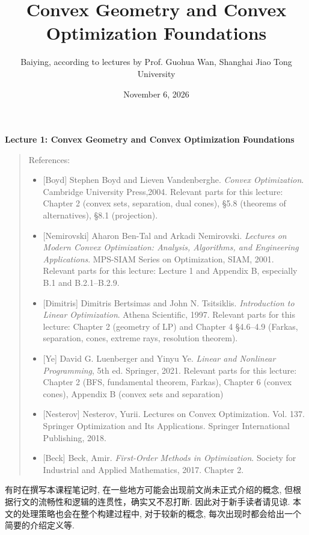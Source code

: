 \documentclass[11pt,UTF8,scheme=plain,fontset=fandol,linespread=1.3]{ctexart}
\title{\textbf{Convex Geometry and Convex Optimization Foundations}}
\author{Baiying, according to lectures by Prof. Guohua Wan, Shanghai Jiao Tong University}
\date{November 6, 2026}
\numberwithin{figure}{section}
\begin{document}
\maketitle
\textbf{Lecture 1: Convex Geometry and Convex Optimization Foundations}

\begin{quote}
References:

\begin{itemize}
\item {}[Boyd] Stephen Boyd and Lieven Vandenberghe. \emph{Convex Optimization}. Cambridge University Press,2004. Relevant parts for this lecture: Chapter 2 (convex sets, separation, dual cones), §5.8 (theorems of alternatives), §8.1 (projection).


\item {}[Nemirovski] Aharon Ben-Tal and Arkadi Nemirovski. \emph{Lectures on Modern Convex Optimization: Analysis, Algorithms, and Engineering Applications}. MPS-SIAM Series on Optimization, SIAM, 2001. Relevant parts for this lecture: Lecture 1 and Appendix B, especially B.1 and B.2.1–B.2.9.


\item {}[Dimitris] Dimitris Bertsimas and John N. Tsitsiklis. \emph{Introduction to Linear Optimization}. Athena Scientific, 1997. Relevant parts for this lecture: Chapter 2 (geometry of LP) and Chapter 4 §4.6–4.9 (Farkas, separation, cones, extreme rays, resolution theorem).


\item {}[Ye] David G. Luenberger and Yinyu Ye. \emph{Linear and Nonlinear Programming}, 5th ed. Springer, 2021. Relevant parts for this lecture: Chapter 2 (BFS, fundamental theorem, Farkas), Chapter 6 (convex cones), Appendix B (convex sets and separation)


\item {}[Nesterov] Nesterov, Yurii. Lectures on Convex Optimization. Vol. 137. Springer Optimization and Its Applications. Springer International Publishing, 2018.


\item {}[Beck] Beck, Amir. \emph{First-Order Methods in Optimization}. Society for Industrial and Applied Mathematics, 2017. Chapter 2.


\end{itemize}

\end{quote}

有时在撰写本课程笔记时, 在一些地方可能会出现前文尚未正式介绍的概念, 但根据行文的流畅性和逻辑的连贯性，确实又不忍打断. 因此对于新手读者请见谅. 本文的处理策略也会在整个构建过程中, 对于较新的概念, 每次出现时都会给出一个简要的介绍定义等.
\end{document}
